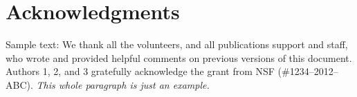 \documentclass{sigchi}
\begin{document}
\section{Acknowledgments}

Sample text: We thank all the volunteers, and all publications support
and staff, who wrote and provided helpful comments on previous
versions of this document. Authors 1, 2, and 3 gratefully acknowledge
the grant from NSF (\#1234--2012--ABC). \textit{This whole paragraph is
  just an example.}
  


%
%
%
%
%
\balance{}
\balance{}



\end{document}

